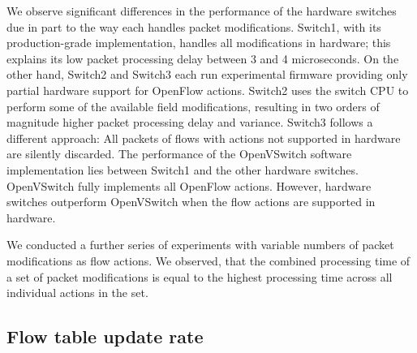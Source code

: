 We observe significant differences in the performance of the hardware
switches due in part to the way each handles packet
modifications. Switch1, with its production-grade implementation,
handles all modifications in hardware; this explains its low packet
processing delay between 3 and 4 microseconds. On the other hand,
Switch2 and Switch3 each run experimental firmware providing only
partial hardware support for OpenFlow actions. Switch2 uses the switch
CPU to perform some of the available field modifications, resulting in two orders
of magnitude higher packet processing delay and variance.
Switch3 follows a different approach: All packets of flows with
actions not supported in hardware are silently discarded. The
performance of the OpenVSwitch software implementation lies between
Switch1 and the other hardware switches.  OpenVSwitch fully implements
all OpenFlow actions. However, hardware switches outperform
OpenVSwitch when the flow actions are supported in hardware.
%
%

We conducted a further series of experiments with variable numbers of packet
modifications as flow actions. We observed, that the combined processing time of
a set of packet modifications is equal to the highest processing time across all
individual actions in the set.

\subsection{Flow table update rate}\label{sec:results-rate}

